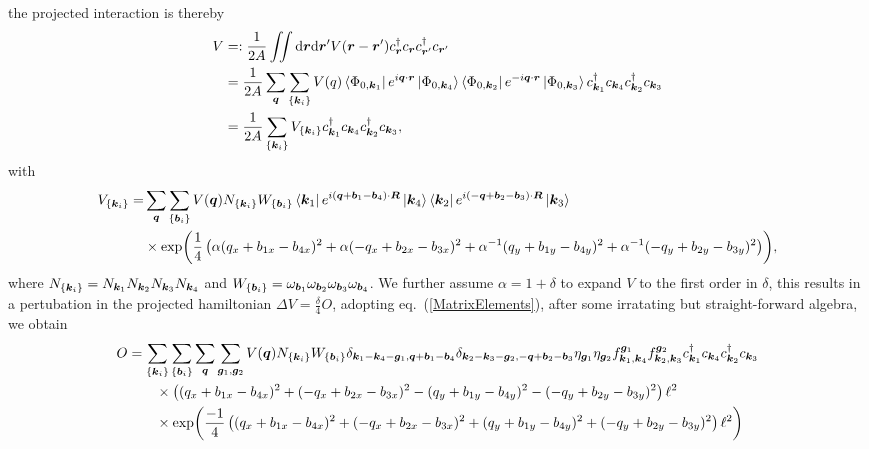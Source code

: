 \documentclass[%
nofootinbib,
 amsmath,amssymb,
 aps,onecolumn,
prb
]{revtex4-2}
\begin{document}
the projected interaction is thereby
\begin{align}
    V&=:\frac{1}{2A}\iint\dd\vb*{r}\dd\vb*{r}^\prime V(\vb*{r}-\vb*{r}^\prime)c_{\vb*{r}}^\dag c_{\vb*{r}}c_{\vb*{r}^\prime}^\dag c_{\vb*{r}^\prime} \nonumber\\ 
    &=\frac{1}{2A}\sum_{\vb*{q}}\sum_{\{\vb*{k}_i\}}V(q)\bra{\Phi_{0,\vb*{k}_1}}e^{i\vb*{q}\cdot\vb*{r}}\ket{\Phi_{0,\vb*{k}_4}}\bra{\Phi_{0,\vb*{k}_2}}e^{-i\vb*{q}\cdot\vb*{r}}\ket{\Phi_{0,\vb*{k}_3}}c_{\vb*{k}_1}^\dag c_{\vb*{k}_4}c_{\vb*{k}_2}^\dag c_{\vb*{k}_3}\nonumber\\ 
    &=\frac{1}{2A}\sum_{\{\vb*{k}_i\}}V_{\{\vb*{k}_i\}}c_{\vb*{k}_1}^\dag c_{\vb*{k}_4}c_{\vb*{k}_2}^\dag c_{\vb*{k}_3},
\end{align}
with 
\begin{align}
    V_{\{\vb*{k}_i\}}=&\sum_{\vb*{q}}\sum_{\{\vb*{b}_i\}}V(\vb*{q})N_{\{\vb*{k}_i\}}W_{\{\vb*{b}_i\}}\bra{\vb*{k}_1}e^{i(\vb*{q}+\vb*{b}_1-\vb*{b}_4)\cdot\vb*{R}}\ket{\vb*{k}_4} 
            \bra{\vb*{k}_2}e^{i(-\vb*{q}+\vb*{b}_2-\vb*{b}_3)\cdot\vb*{R}}\ket{\vb*{k}_3}\nonumber\\ 
        &\times\exp(\frac{1}{4}\left(\alpha(q_x+b_{1x}-b_{4x})^2+\alpha(-q_x+b_{2x}-b_{3x})^2+\alpha^{-1}(q_y+b_{1y}-b_{4y})^2+\alpha^{-1}(-q_y+b_{2y}-b_{3y})^2\right)),
\end{align}
where $N_{\{\vb*{k}_i\}}=N_{\vb*{k}_1}N_{\vb*{k}_2}N_{\vb*{k}_3}N_{\vb*{k}_4}$ and $W_{\{\vb*{b}_i\}}=\omega_{\vb*{b}_1}\omega_{\vb*{b}_2}\omega_{\vb*{b}_3}\omega_{\vb*{b}_4}$.
We further assume $\alpha=1+\delta$ to expand $V$ to the first order in $\delta$, this results in a pertubation in the projected hamiltonian $\Delta V=\frac{\delta}{4}O$, adopting eq.~(\ref{MatrixElements}), after some irratating but straight-forward algebra, we obtain
\begin{align}
    O&=\sum_{\{\vb*{k}_i\}}\sum_{\{\vb*{b}_i\}}\sum_{\vb*{q}}\sum_{\vb*{g}_1,\vb*{g}_2} V(\vb*{q})N_{\{\vb*{k}_i\}}W_{\{\vb*{b}_i\}}\delta_{\vb*{k}_1-\vb*{k}_4-\vb*{g}_1,\vb*{q}+\vb*{b}_1-\vb*{b}_4}\delta_{\vb*{k}_2-\vb*{k}_3-\vb*{g}_2,-\vb*{q}+\vb*{b}_2-\vb*{b}_3} 
            \eta_{{\vb*{g}_1}}\eta_{{\vb*{g}_2}}f_{\vb*{k}_1,\vb*{k}_4}^{\vb*{g}_1}f_{\vb*{k}_2,\vb*{k}_3}^{\vb*{g}_2} c_{\vb*{k}_1}^\dag c_{\vb*{k}_4}c_{\vb*{k}_2}^\dag c_{\vb*{k}_3}\nonumber\\ 
    &\quad\quad\times \left((q_x+b_{1x}-b_{4x})^2+(-q_x+b_{2x}-b_{3x})^2-(q_y+b_{1y}-b_{4y})^2-(-q_y+b_{2y}-b_{3y})^2\right)\ell^2\nonumber\\ 
    &\quad\quad\times \exp(\frac{-1}{4}\left((q_x+b_{1x}-b_{4x})^2+(-q_x+b_{2x}-b_{3x})^2+(q_y+b_{1y}-b_{4y})^2+(-q_y+b_{2y}-b_{3y})^2\right)\ell^2)
\end{align} 
\end{document}
